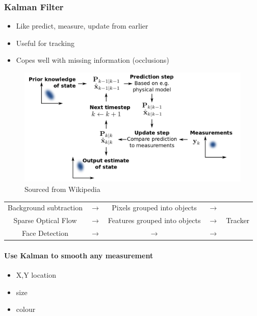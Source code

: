 \documentclass[paper=a4, fontsize=11pt]{article} %
\numberwithin{equation}{section} %
\numberwithin{figure}{section} %
\numberwithin{table}{section} %
\begin{document}
\subsubsection{Kalman Filter}

\begin{itemize}
\item Like predict, measure, update from earlier
\item Useful for tracking
\item Copes well with missing information (occlusions) 
\end{itemize}

\begin{figure}[h]
    \centering
\includegraphics[scale=0.3]{images/kalman}
\caption{Sourced from Wikipedia}
    \label{fig:kalman}
\end{figure}

\begin{center}

\begin{tabular}{| c  c  c  c | c |}
\hline
Background subtraction & $\rightarrow$ & Pixels grouped into objects & $\rightarrow$ & \multirow{3}{4em}{Tracker} \\ 
Sparse Optical Flow &  $\rightarrow$  & Features grouped into objects &  $\rightarrow$  & \\ 
Face Detection &   $\rightarrow$   &  $\rightarrow$  &   $\rightarrow$   & \\ \hline

\end{tabular}
\end{center}

\paragraph{Use Kalman to smooth any measurement}
\begin{itemize}
\item X,Y location
\item size
\item colour
\end{itemize}
\end{document}

